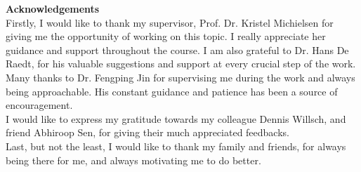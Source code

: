 \documentclass[12]{article}
\begin{document}
\centering
\textbf{Acknowledgements}\\

Firstly, I would like to thank my supervisor, Prof. Dr. Kristel Michielsen for giving me the opportunity of working on this topic. I really appreciate her guidance and support throughout the course. I am also grateful to Dr. Hans De Raedt, for his valuable suggestions and support at every crucial step of the work.\\
Many thanks to Dr. Fengping Jin for supervising me during the work and always being approachable. His constant guidance and patience has been a source of encouragement. \\

I would like to express my gratitude towards my colleague Dennis Willsch, and friend Abhiroop Sen, for giving their much appreciated feedbacks. \\

Last, but not the least, I would like to thank my family and friends, for always being there for me, and always motivating me to do better. 
\end{document}
